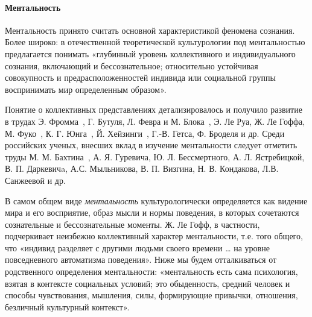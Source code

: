 \paragraph{Ментальность}
\label{mentality}
Ментальность принято считать основной характеристикой феномена сознания\autocite[][52]{edoshina2000}. Более широко: в отечественной теоретической культурологии под ментальностью предлагается понимать «глубинный уровень коллективного и индивидуального сознания, включающий и бессознательное; относительно устойчивая совокупность и предрасположенностей индивида или социальной группы воспринимать мир определенным образом»\autocite[][414]{razlogov2005}.

Понятие о коллективных представлениях детализировалось и получило развитие в трудах Э. Фромма~\autocite{book:davydov}, Г. Бутуля,
Л. Февра и М. Блока~\autocite{book:febvre}, Э. Ле Руа, Ж. Ле Гоффа,
М. Фуко~\autocite{book:arch}, К. Г. Юнга~\autocite{book:yung},
Й. Хейзинги~\autocite{book:heizenga}, Г.-В. Гетса, Ф. Броделя  и др. Среди российских ученых, внесших вклад в изучение ментальности следует отметить труды М. М. Бахтина~\autocite{book:tamarchenko}, А. Я. Гуревича, Ю. Л. Бессмертного, А. Л. Ястребицкой, В. П. Даркевичa\autocite{levit1998}, А.С. Мыльникова\autocite{milnikov1996}, В. П. Визгина, Н. В. Кондакова, Л.В. Санжеевой\autocite{sanjeeva2011} и др.

В самом общем виде \emph{ментальность} культурологически определяется как
видение мира и его восприятие, образ мысли и нормы поведения, в которых сочетаются
сознательные и бессознательные моменты. Ж. Ле Гофф, в частности, подчеркивает неизбежно коллективный характер ментальности, т.е. того общего, что «индивид разделяет с другими людьми своего времени … на уровне повседневного автоматизма поведения»\autocite{sharte2004}. Ниже мы будем отталкиваться от родственного определения ментальности: «ментальность есть сама психология, взятая в контексте социальных условий; это обыденность, средний человек и способы чувствования, мышления, силы, формирующие привычки, отношения, безличный культурный контекст»\autocite{online:kulturolog}.


